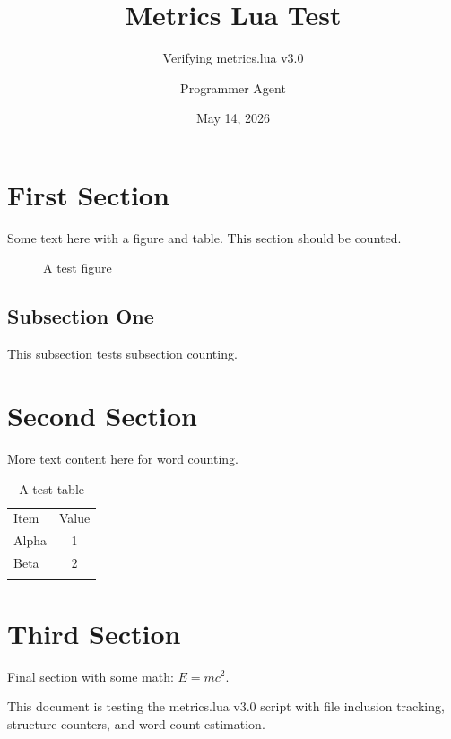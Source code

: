 \documentclass[11pt, a4paper]{scrartcl}
\title{Metrics Lua Test}
\subtitle{Verifying metrics.lua v3.0}
\author{Programmer Agent}
\date{May 14, 2026}
\begin{document}
\swarmtitlepage

\section{First Section}
Some text here with a figure and table. This section should be counted.

\begin{figure}[H]
  \centering
  \caption{A test figure}
\end{figure}

\subsection{Subsection One}
This subsection tests subsection counting.

\section{Second Section}
More text content here for word counting.

\begin{table}[H]
  \centering
  \begin{tabular}{l c}
    \swarmtoprule
    Item & Value \\
    \swarmmidrule
    Alpha & 1 \\
    Beta & 2 \\
    \swarmbottomrule
  \end{tabular}
  \caption{A test table}
\end{table}

\section{Third Section}
Final section with some math: $E = mc^2$.
\label{eq:einstein}

\begin{noteblock}
This document is testing the metrics.lua v3.0 script with file inclusion
tracking, structure counters, and word count estimation.
\end{noteblock}
\end{document}
